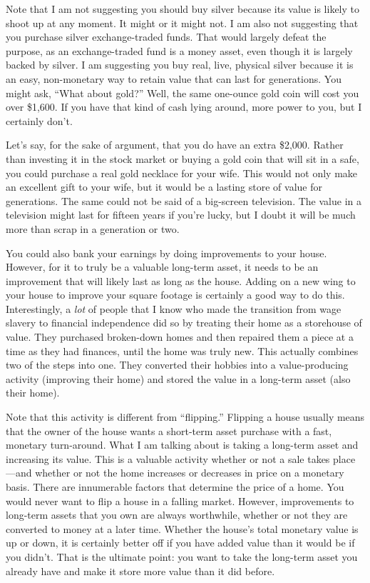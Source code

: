 Note that I am not suggesting you should buy silver because its value is
likely to shoot up at any moment. It might or it might not. I am also not
suggesting that you purchase silver exchange-traded funds. That would
largely defeat the purpose, as an exchange-traded fund is a money
asset, even though it is largely backed by silver. I am suggesting you
buy real, live, physical silver because it is an easy, non-monetary way
to retain value that can last for generations. You might ask, “What
about gold?”  Well, the same one-ounce gold coin will cost you over
\$1,600. If you have that kind of cash lying around, more power to you,
but I certainly don’t. 

Let’s say, for the sake of argument, that you do have an extra \$2,000.
Rather than investing it in the stock market or buying a gold coin that
will sit in a safe, you could purchase a real gold necklace for your
wife. This would not only make an excellent gift to your wife, but it
would be a lasting store of value for generations. The same could not
be said of a big-screen television. The value in a television might last for fifteen
years if you’re lucky, but I doubt it will be much more than scrap in
a generation or two.  

You could also bank your earnings by doing improvements to your house.
However, for it to truly be a valuable long-term asset, it needs to be
an improvement that will likely last as long as the house. Adding on a
new wing to your house to improve your square footage is certainly a
good way to do this. Interestingly, a \textit{lot} of people that I
know who made the transition from wage slavery to financial
independence did so by treating their home as a storehouse of value.
They purchased broken-down homes and then repaired them a piece at a
time as they had finances, until the home was truly new. This actually
combines two of the steps into one. They converted their hobbies into a
value-producing activity (improving their home) and stored the value in
a long-term asset (also their home). 

Note that this activity is different from ``flipping.''  Flipping a house
usually means that the owner of the house wants a short-term asset
purchase with a fast, monetary turn-around. What I am talking about is
taking a long-term asset and increasing its value. This is a valuable
activity whether or not a sale takes place---and whether or not the home
increases or decreases in price on a monetary basis. There are
innumerable factors that determine the price of a home. You would never
want to flip a house in a falling market. However, improvements to
long-term assets that you own are always worthwhile, whether or not
they are converted to money at a later time. Whether the
house's total monetary value is up or down, it is
certainly better off if you have added value than it would be if you
didn’t. That is the ultimate point: you want to take the long-term
asset you already have and make it store more value than it did
before.

